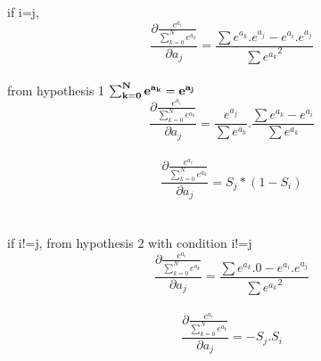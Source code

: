 \documentclass{article}
\begin{document}
if i=j,
\[\frac{\partial{\frac{e^{a_{i}}}{\sum_{k=0}^{N}e^{a_{k}}}}}{\partial{a_{j}}}=\frac{\sum{{e^{a_{k}}}}.e^{a_{j}}-{e^{a_{i}}.e^{a_{j}}}}{{\sum{e^{a_{k}}}}^2}\]
\\
from hypothesis 1 $\bf{\sum_{k=0}^{N}{e^{a_{k}}}=e^{a_{j}}}$
\\
\[\frac{\partial{\frac{e^{a_{i}}}{\sum_{k=0}^{N}e^{a_{k}}}}}{\partial{a_{j}}}=\frac{e^{a_{j}}}{\sum{e^{a_{k}}}}.{\frac{\sum{e^{a_{k}}}-e^{a_{i}}}{\sum{e^{a_{k}}}}}\]
\\
\[\frac{\partial{\frac{e^{a_{i}}}{\sum_{k=0}^{N}e^{a_{k}}}}}{\partial{a_{j}}}={S_{j}}*(1-{S_{i}})\]
\\
\\
if i!=j,
from hypothesis 2 with condition i!=j
\\
\[\frac{\partial{\frac{e^{a_{i}}}{\sum_{k=0}^{N}e^{a_{k}}}}}{\partial{a_{j}}}=\frac{\sum{{e^{a_{k}}}}.0-{e^{a_{i}}.e^{a_{j}}}}{{\sum{e^{a_{k}}}}^2}\]
\\
\[\frac{\partial{\frac{e^{a_{i}}}{\sum_{k=0}^{N}e^{a_{k}}}}}{\partial{a_{j}}}=-{S_{j}}.{S_{i}}\]
\end{document}
